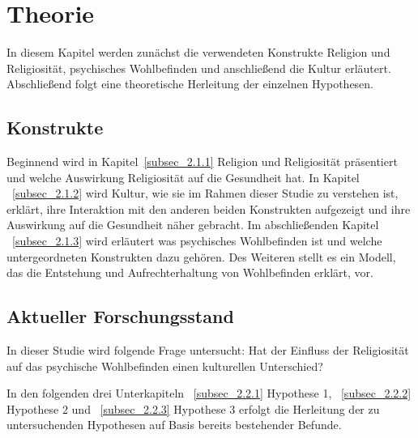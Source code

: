 

\chapter{Theorie}   \label{ch_2}
In diesem Kapitel werden zunächst die verwendeten Konstrukte Religion und Religiosität, psychisches Wohlbefinden und anschließend die Kultur erläutert. Abschließend folgt eine theoretische Herleitung der einzelnen Hypothesen.

\section{Konstrukte}    \label{sec_2.1}
Beginnend wird in Kapitel~\ref{subsec_2.1.1} Religion und Religiosität präsentiert und welche Auswirkung Religiosität auf die Gesundheit hat. In Kapitel ~\ref{subsec_2.1.2} wird Kultur, wie sie im Rahmen dieser Studie zu verstehen ist, erklärt, ihre Interaktion mit den anderen beiden Konstrukten aufgezeigt und ihre Auswirkung auf die Gesundheit näher gebracht. Im abschließenden Kapitel ~\ref{subsec_2.1.3} wird erläutert was psychisches Wohlbefinden ist und welche untergeordneten Konstrukten dazu gehören. Des Weiteren stellt es ein Modell, das die Entstehung und Aufrechterhaltung von Wohlbefinden erklärt, vor.





\section{Aktueller Forschungsstand}   \label{sec_2.2}
In dieser Studie wird folgende Frage untersucht: Hat der Einfluss der Religiosität auf das psychische Wohlbefinden einen kulturellen Unterschied? 

In den folgenden drei Unterkapiteln ~\ref{subsec_2.2.1} Hypothese 1, ~\ref{subsec_2.2.2} Hypothese 2 und ~\ref{subsec_2.2.3} Hypothese 3 erfolgt die Herleitung der zu untersuchenden Hypothesen auf Basis bereits bestehender Befunde.



